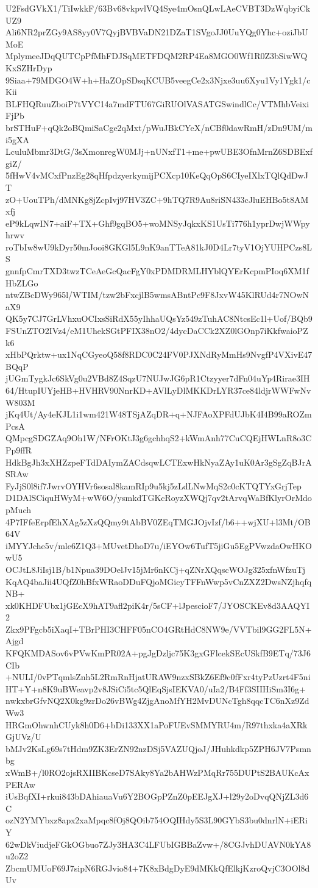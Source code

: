 U2FsdGVkX1/TiIwkkF/63Bv68vkpvlVQ4Sye4mOsnQLwLAeCVBT3DzWqbyiCkUZ9
Ali6NR2prZGy9AS8yy0V7QyjBVBVaDN21DZaT1SVgoJJ0UuYQg0Yhc+oziJbUMoE
MplymeeJDqQUTCpPfMhFDJSqMETFDQM2RP4Ea8MGO0Wf1R0Z3bSiwWQKxSZHrDyp
9Siaa+79MDGO4W+h+HaZOpSDsqKCUB5veegCe2x3Njxe3uu6Xyu1Vy1Ygk1/cKii
BLFHQRuuZboiP7tVYC14a7mdFTU67GiRUOlVASATGSwindlCc/VTMhbVeixiFjPb
brSTHuF+qQk2oBQmiSaCge2qMxt/pWuJBkCYeX/nCBf0dawRmH/zDn9UM/mi5gXA
LculuMbmr3DtG/3sXmonregW0MJj+nUNxfT1+me+pwUBE3OfnMrnZ6SDBExfgiZ/
5fHwV4vMCxfPnzEg28qHfpdzyerkymijPCXcp10KeQqOpS6CIyeIXlxTQlQdDwJT
zO+UouTPh/dMNKg8jZcpIvj97HV3ZC+9hTQ7R9Au8riSN433cJluEHBo5t8AMxfj
eP9kLqwIN7+aiF+TX+Ghf9gqBO5+woMNSyJqkxKS1UsTi776h1yprDwjWWpyhrwv
roTbIw8wU9kDyr50mJooi8GKGl5L9nK9anTTeA81kJ0D4Lr7tyV1OjYUHPCzs8LS
gnnfpCmrTXD3twzTCeAeGcQacFgY0xPDMDRMLHYblQYErKcpmPIoq6XM1fHbZLGo
ntwZBcDWy965l/WTIM/tzw2bFxcjlB5wmsABntPc9F8JxvW45KlRUd4r7NOwNaX9
QK5y7CJ7GrLVhxuOCIxsSiRdX55yIhhaUQsYz549zTuhAC8NtcsEc1l+Uof/BQb9
FSUnZTO2IVz4/eM1UhekSGtPFIX38nO2/4dycDaCCk2XZ0lGOnp7iKkfwaioPZk6
xHbPQrktw+ux1NqCGyeoQ58f8RDC0C24FV0PJXNdRyMmHs9NvgfP4VXivE47BQqP
jUGmTygkJc6SkVg0u2VBd8Z4SqzU7NUJwJG6pR1Ctzyyer7dFn04uYp4Rirae3IH
64/HtupIUYjeHB+HVHRV90NnrKD+AVlLyDlMKKDrLYR37ce84ldjrWWFwNvW803M
jKq4Ut/Ay4eKJL1i1wm421W48TSjAZqDR+q+NJFAoXPFdUJbK4I4B99aROZmPcsA
QMpcgSDGZAq9Oh1W/NFrOKtJ3g6gchhqS2+kWmAnh77CuCQEjHWLnR8o3CPp9ffR
HdkBgJh3xXHZzpeFTdDAIymZACdsqwLCTExwHkNyaZAy1uK0Ar3gSgZqBJrASRAw
FyJjS0l8if7JwrvOYHVr6sosal8kamRIp9u5kj5zLdLNwMqS2c0cKTQTYxGrjTep
D1DAlSCiquHWyM+wW6O/ysmkdTGKcRoyzXWQj7qv2tArvqWaBfKlyrOrMdopMuch
4P7IFfeErpfEhXAg5zXzQQmy9tAbBV0ZEqTMGJOjvIzf/b6++wjXU+l3Mt/OB64V
iMYYJche5v/mle6Z1Q3+MUvetDhoD7u/iEYOw6TufT5jiGu5EgPVwzdaOwHKOwU5
OCJtL8JiIsj1B/b1Npua39DOelJv15jMr6nKCj+qZNrXQqscWOJg325xfnWfzuTj
KqAQ4baJii4UQfZ0hBfxWRaoDDuFQjoMGicyTFFnWwp5vCnZXZ2DwsNZjhqfqNB+
xk0KHDFUbx1jGEcX9hAT9afl2piK4r/5sCF+lJpescioF7/JYOSCKEv8d3AAQYI2
Zkx9PFgcb5iXaqI+TBrPHI3CHFF05nCO4GRtHdC8NW9e/VVTbil9GG2FL5N+Ajgd
KFQKMDASov6vPVwKmPR02A+pgJgDzljc75K3gxGFlcekSEcUSkfB9ETq/73J6CIb
+NULI/0vPTqmlsZnh5L2RmRnHjatURAW9nzxSBkZ6Ef9c0fFxr4tyPzUzrt4F5ni
HT+Y+n8K9uBWeavp2v8JSiCi5tc5QlEqSjsIEKVA0/uIa2/B4Ff3SIIHiSm3I6g+
nwkxbrGfvNQ2X0kg9zrDo26vBWg4ZjgAnoMfYH2MvDUNcTgh8qqcTC6nXz9ZdWw3
HRGmOhwnhCUyk8h0D6+bDi133XX1aPoFUEvSMMYRU4m/R97thxka4aXRkGjUVz/U
bMJv2KsLg69s7tHdm9ZK3ErZN92nzDSj5VAZUQjoJ/JHuhkdkp5ZPH6JV7Psmnbg
xWmB+/l0RO2ojsRXIIBKcseD7SAky8Ya2bAHWzPMqRr755DUPtS2BAUKcAxPERAw
iUsBqfXI+rkui843bDAhiauaVu6Y2BOGpPZnZ0pEEJgXJ+l29y2oDvqQNjZL3d6C
ozN2YMYbxz8apx2xaMpqc8fOj8QOib754OQIHdy5S3L90GYbS3bu0dnrlN+iERiY
62wDkViudjeFGkOGbuo7ZJy3HA3C4LFUbIGBBaZvw+/8CGJvhDUAVN0kYA8u2oZ2
ZbcmUMUoF69J7sipN6RGJvio84+7K8xBdgDyE9dMKkQfElkjKzroQvjC3OOl8dUv
